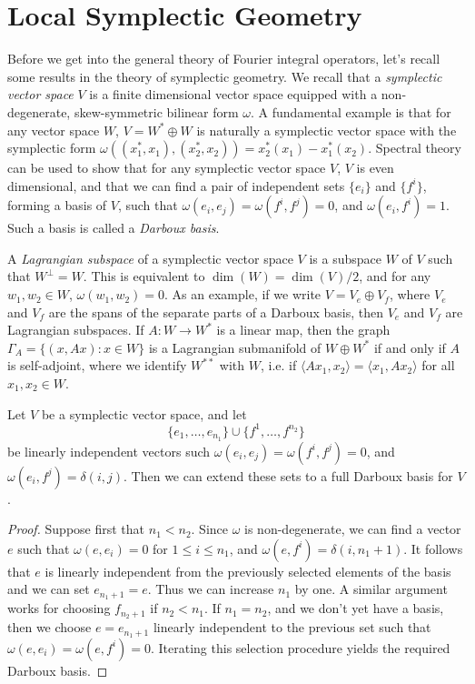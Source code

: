 


\section{Local Symplectic Geometry}

Before we get into the general theory of Fourier integral operators, let's recall some results in the theory of symplectic geometry. We recall that a \emph{symplectic vector space} $V$ is a finite dimensional vector space equipped with a non-degenerate, skew-symmetric bilinear form $\omega$. A fundamental example is that for any vector space $W$, $V = W^* \oplus W$ is naturally a symplectic vector space with the symplectic form $\omega((x^*_1,x_1),(x^*_2,x_2)) = x^*_2(x_1) - x^*_1(x_2)$. Spectral theory can be used to show that for any symplectic vector space $V$, $V$ is even dimensional, and that we can find a pair of independent sets $\{ e_i \}$ and $\{ f^i \}$, forming a basis of $V$, such that $\omega(e_i,e_j) = \omega(f^i,f^j) = 0$, and $\omega(e_i,f^i) = 1$. Such a basis is called a \emph{Darboux basis}.

A \emph{Lagrangian subspace} of a symplectic vector space $V$ is a subspace $W$ of $V$ such that $W^\perp = W$. This is equivalent to $\dim(W) = \dim(V) / 2$, and for any $w_1,w_2 \in W$, $\omega(w_1,w_2) = 0$. As an example, if we write $V = V_e \oplus V_f$, where $V_e$ and $V_f$ are the spans of the separate parts of a Darboux basis, then $V_e$ and $V_f$ are Lagrangian subspaces. If $A: W \to W^*$ is a linear map, then the graph $\Gamma_A = \{ (x,Ax) : x \in W \}$ is a Lagrangian submanifold of $W \oplus W^*$ if and only if $A$ is self-adjoint, where we identify $W^{**}$ with $W$, i.e. if $\langle Ax_1, x_2 \rangle = \langle x_1, Ax_2 \rangle$ for all $x_1,x_2 \in W$.

\begin{lemma}
    Let $V$ be a symplectic vector space, and let
    \[ \{ e_1, \dots, e_{n_1} \} \cup \{ f^1, \dots, f^{n_2} \} \]
    be linearly independent vectors such $\omega(e_i,e_j) = \omega(f^i,f^j) = 0$, and $\omega(e_i,f^j) = \delta(i,j)$. Then we can extend these sets to a full Darboux basis for $V$.
\end{lemma}
\begin{proof}
    Suppose first that $n_1 < n_2$. Since $\omega$ is non-degenerate, we can find a vector $e$ such that $\omega(e,e_i) = 0$ for $1 \leq i \leq n_1$, and $\omega(e,f^i) = \delta(i,n_1 + 1)$. It follows that $e$ is linearly independent from the previously selected elements of the basis and we can set $e_{n_1 + 1} = e$. Thus we can increase $n_1$ by one. A similar argument works for choosing $f_{n_2 + 1}$ if $n_2 < n_1$. If $n_1 = n_2$, and we don't yet have a basis, then we choose $e = e_{n_1 + 1}$ linearly independent to the previous set such that $\omega(e,e_i) = \omega(e,f^i) = 0$. Iterating this selection procedure yields the required Darboux basis.
\end{proof}


